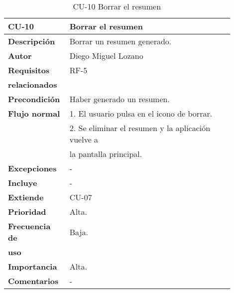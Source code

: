 \begin{longtable}{>{\raggedright}b{0.2\linewidth}>{\raggedright\arraybackslash}b{0.7\linewidth}}
	\toprule
	\textbf{CU-10} & \textbf{Borrar el resumen} \\
	\toprule
	\endhead
	
	\toprule
	\caption{CU-10 Borrar el resumen}
	\endfoot
	
	\small{\textbf{Descripción}} & Borrar un resumen generado. \\
	\small{\textbf{Autor}} & Diego Miguel Lozano \\
	\small{\textbf{Requisitos}} & RF-5  \\
	\small{\textbf{relacionados}} & \\
	\small{\textbf{Precondición}} & Haber generado un resumen. \\
	\small{\textbf{Flujo normal}} & \quad \small{1. El usuario pulsa en el icono de borrar.} \\
	 & \quad \small{2. Se eliminar el resumen y la aplicación vuelve a} \\
	 & \qquad \small{la pantalla principal.} \\
	\small{\textbf{Excepciones}} & - \\
	\small{\textbf{Incluye}} & - \\
	\small{\textbf{Extiende}} & CU-07 \\
	\small{\textbf{Prioridad}} & Alta. \\
	\small{\textbf{Frecuencia de}} & Baja. \\
	\small{\textbf{uso}} & \\
	\small{\textbf{Importancia}} & Alta. \\
	\small{\textbf{Comentarios}} & - \\
\end{longtable}